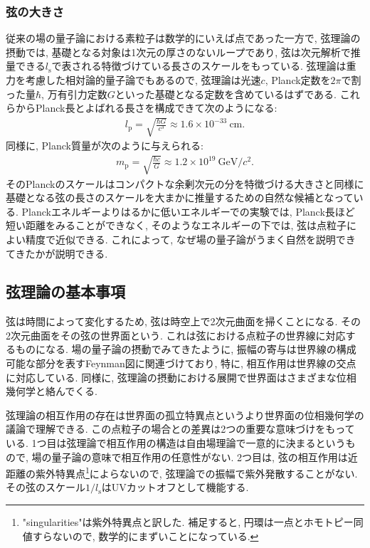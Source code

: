 \documentclass[10pt,a4paper]{jsarticle}
\begin{document}
\subsubsection*{弦の大きさ}
従来の場の量子論における素粒子は数学的にいえば点であった一方で, 弦理論の摂動では, 基礎となる対象は1次元の厚さのないループであり, 弦は次元解析で推量できる$l_{\mathrm{s}}$で表される特徴づけている長さのスケールをもっている. 弦理論は重力を考慮した相対論的量子論でもあるので, 弦理論は光速$c$, Planck定数を$2\pi $で割った量$\hbar$, 万有引力定数$G$といった基礎となる定数を含めているはずである. これらからPlanck長とよばれる長さを構成できて次のようになる: 
\begin{align*}
    l_{\mathrm{p}} = \sqrt{ \frac{\hbar G}{c^3} } \approx 1.6 \times 10^{-33} \ \mathrm{cm}.
\end{align*}
同様に, Planck質量が次のように与えられる: 
\begin{align*}
    m_{\mathrm{p}} = \sqrt{ \frac{\hbar c}{G} } \approx 1.2 \times 10^{19} \ \mathrm{GeV} / c^2.
\end{align*}
そのPlanckのスケールはコンパクトな余剰次元の分を特徴づける大きさと同様に基礎となる弦の長さのスケールを大まかに推量するための自然な候補となっている. Planckエネルギーよりはるかに低いエネルギーでの実験では, Planck長ほど短い距離をみることができなく, そのようなエネルギーの下では, 弦は点粒子によい精度で近似できる. これによって, なぜ場の量子論がうまく自然を説明できてきたかが説明できる. 
\subsection{弦理論の基本事項}
弦は時間によって変化するため, 弦は時空上で2次元曲面を掃くことになる. その2次元曲面をその弦の世界面という. これは弦における点粒子の世界線に対応するものになる. 場の量子論の摂動でみてきたように, 振幅の寄与は世界線の構成可能な部分を表すFeynman図に関連づけており, 特に, 相互作用は世界線の交点に対応している. 同様に, 弦理論の摂動における展開で世界面はさまざまな位相幾何学と絡んでくる. \par
弦理論の相互作用の存在は世界面の孤立特異点というより世界面の位相幾何学の議論で理解できる. この点粒子の場合との差異は2つの重要な意味づけをもっている. 1つ目は弦理論で相互作用の構造は自由場理論で一意的に決まるというもので, 場の量子論の意味で相互作用の任意性がない. 2つ目は, 弦の相互作用は近距離の紫外特異点\footnote{"singularities"は紫外特異点と訳した. 補足すると, 円環は一点とホモトピー同値すらないので, 数学的にまずいことになっている. }によらないので, 弦理論での振幅で紫外発散することがない. その弦のスケール$1/l_{\mathrm{s}}$はUVカットオフとして機能する. 
\end{document}
